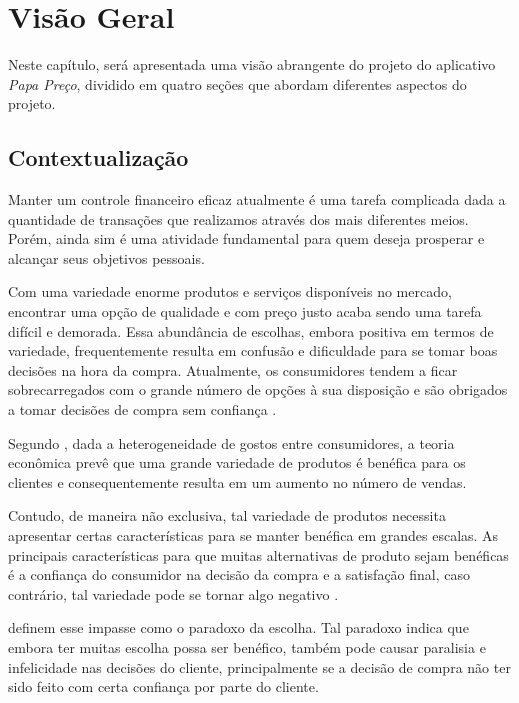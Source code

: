 \chapter{Visão Geral} \label{cha:visaogeral}
Neste capítulo, será apresentada uma visão abrangente do projeto do aplicativo \textit{Papa Preço}, dividido em quatro seções que abordam diferentes aspectos do projeto.

\section{Contextualização} \label{sec:contextualizacao}

Manter um controle financeiro eficaz atualmente é uma tarefa complicada dada a quantidade de transações que realizamos através dos mais diferentes meios. Porém, ainda sim é uma atividade fundamental para quem deseja prosperar e alcançar seus objetivos pessoais.

Com uma variedade enorme produtos e serviços disponíveis no mercado, encontrar uma opção de qualidade e com preço justo acaba sendo uma tarefa difícil e demorada. Essa abundância de escolhas, embora positiva em termos de variedade, frequentemente resulta em confusão e dificuldade para se tomar boas decisões na hora da compra. Atualmente, os consumidores tendem a ficar sobrecarregados com o grande número de opções à sua disposição e são obrigados a tomar decisões de compra sem confiança \cite{huber2012dazing, nicholls2006purchase}.

Segundo \textcite{heitmann2007effect}, dada a heterogeneidade de gostos entre consumidores, a teoria econômica prevê que uma grande variedade de produtos é benéfica para os clientes e consequentemente resulta em um aumento no número de vendas.

Contudo, de maneira não exclusiva, tal variedade de produtos necessita apresentar certas características para se manter benéfica em grandes escalas. As principais características para que muitas alternativas de produto sejam benéficas é a confiança do consumidor na decisão da compra e a satisfação final, caso contrário, tal variedade pode se tornar algo negativo \cite{schwartz2002maximizing}.

\textcite{tang2017purchase} definem esse impasse como o paradoxo da escolha. Tal paradoxo indica que embora ter muitas escolha possa ser benéfico, também pode causar paralisia e infelicidade nas decisões do cliente, principalmente se a decisão de compra não ter sido feito com certa confiança por parte do cliente. 

